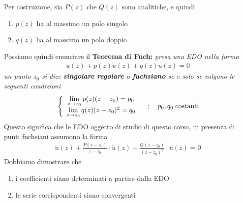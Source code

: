 \newpage

Per costruzione, sia $P(z)$ che $Q(z)$ sono analitiche, e quindi
\begin{enumerate}
	\item $p(z)$ ha al massimo un polo singolo
	\item $q(z)$ ha al massimo un polo doppio
\end{enumerate}

Possiamo quindi enunciare il \textbf{Teorema di Fuch:} \textit{presa una EDO nella forma
\begin{align}
	\ddot{u}(z) + p(z)\dot{u}(z) + q(z)u(z) = 0
\end{align}
un punto $z_0$ si dice \textbf{singolare regolare} o \textbf{fuchsiano} se e solo se valgono le seguenti condizioni
\begin{align}
	\left\{ \begin{array}{cc} \underset{z \rightarrow z_0}{\lim} \, p(z)(z-z_0) = p_0\\ \underset{z \rightarrow z_0}{\lim} \, q(z)(z-z_0)^2 = q_0 \end{array} \right. \quad ; \quad p_0, q_0 \; \text{costanti}
\end{align}
}
Questo significa che le EDO oggetto di studio di questo corso, in presenza di punti fuchsiani assumono la forma
\begin{align}
	\ddot{u}(z) + \frac{P(z-z_0)}{z-z_0} \cdot \dot{u}(z) + \frac{Q(z-z_0)}{(z-z_0)^2} \cdot u(z) = 0
\end{align}
Dobbiamo dimostrare che
\begin{enumerate}
	\item i coefficienti siano determinati a partire dalla EDO 
	\item le serie corrispondenti siano convergenti
\end{enumerate}

